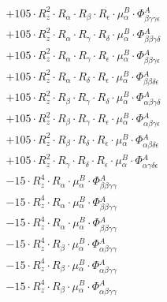 \documentclass{article}
\begin{document}
\begin{subequations}
\begin{gather}
\begin{array}{c}
 \\[0.2em] 		 + 105 \cdot R_{z}^{2} \cdot R_{\alpha{}} \cdot R_{\beta{}} \cdot R_{\epsilon{}} \cdot \mu{}^{B}_{\alpha{}} \cdot \Phi{}^{A}_{\beta{}\gamma{}\gamma{}\epsilon{}} 
 \\[0.2em] 		 + 105 \cdot R_{z}^{2} \cdot R_{\alpha{}} \cdot R_{\gamma{}} \cdot R_{\delta{}} \cdot \mu{}^{B}_{\alpha{}} \cdot \Phi{}^{A}_{\beta{}\beta{}\gamma{}\delta{}} 
 \\[0.2em] 		 + 105 \cdot R_{z}^{2} \cdot R_{\alpha{}} \cdot R_{\gamma{}} \cdot R_{\epsilon{}} \cdot \mu{}^{B}_{\alpha{}} \cdot \Phi{}^{A}_{\beta{}\beta{}\gamma{}\epsilon{}} 
 \\[0.2em] 		 + 105 \cdot R_{z}^{2} \cdot R_{\alpha{}} \cdot R_{\delta{}} \cdot R_{\epsilon{}} \cdot \mu{}^{B}_{\alpha{}} \cdot \Phi{}^{A}_{\beta{}\beta{}\delta{}\epsilon{}} 
 \\[0.2em] 		 + 105 \cdot R_{z}^{2} \cdot R_{\beta{}} \cdot R_{\gamma{}} \cdot R_{\delta{}} \cdot \mu{}^{B}_{\alpha{}} \cdot \Phi{}^{A}_{\alpha{}\beta{}\gamma{}\delta{}} 
 \\[0.2em] 		 + 105 \cdot R_{z}^{2} \cdot R_{\beta{}} \cdot R_{\gamma{}} \cdot R_{\epsilon{}} \cdot \mu{}^{B}_{\alpha{}} \cdot \Phi{}^{A}_{\alpha{}\beta{}\gamma{}\epsilon{}} 
 \\[0.2em] 		 + 105 \cdot R_{z}^{2} \cdot R_{\beta{}} \cdot R_{\delta{}} \cdot R_{\epsilon{}} \cdot \mu{}^{B}_{\alpha{}} \cdot \Phi{}^{A}_{\alpha{}\beta{}\delta{}\epsilon{}} 
 \\[0.2em] 		 + 105 \cdot R_{z}^{2} \cdot R_{\gamma{}} \cdot R_{\delta{}} \cdot R_{\epsilon{}} \cdot \mu{}^{B}_{\alpha{}} \cdot \Phi{}^{A}_{\alpha{}\gamma{}\delta{}\epsilon{}} 
 \\[0.2em] 		 - 15 \cdot R_{z}^{4} \cdot R_{\alpha{}} \cdot \mu{}^{B}_{\alpha{}} \cdot \Phi{}^{A}_{\beta{}\beta{}\gamma{}\gamma{}} 
 \\[0.2em] 		 - 15 \cdot R_{z}^{4} \cdot R_{\alpha{}} \cdot \mu{}^{B}_{\alpha{}} \cdot \Phi{}^{A}_{\beta{}\beta{}\gamma{}\gamma{}} 
 \\[0.2em] 		 - 15 \cdot R_{z}^{4} \cdot R_{\alpha{}} \cdot \mu{}^{B}_{\alpha{}} \cdot \Phi{}^{A}_{\beta{}\beta{}\gamma{}\gamma{}} 
 \\[0.2em] 		 - 15 \cdot R_{z}^{4} \cdot R_{\beta{}} \cdot \mu{}^{B}_{\alpha{}} \cdot \Phi{}^{A}_{\alpha{}\beta{}\gamma{}\gamma{}} 
 \\[0.2em] 		 - 15 \cdot R_{z}^{4} \cdot R_{\beta{}} \cdot \mu{}^{B}_{\alpha{}} \cdot \Phi{}^{A}_{\alpha{}\beta{}\gamma{}\gamma{}} 
 \\[0.2em] 		 - 15 \cdot R_{z}^{4} \cdot R_{\beta{}} \cdot \mu{}^{B}_{\alpha{}} \cdot \Phi{}^{A}_{\alpha{}\beta{}\gamma{}\gamma{}} 

\end{array}
\end{gather}
\end{subequations}
\end{document}
